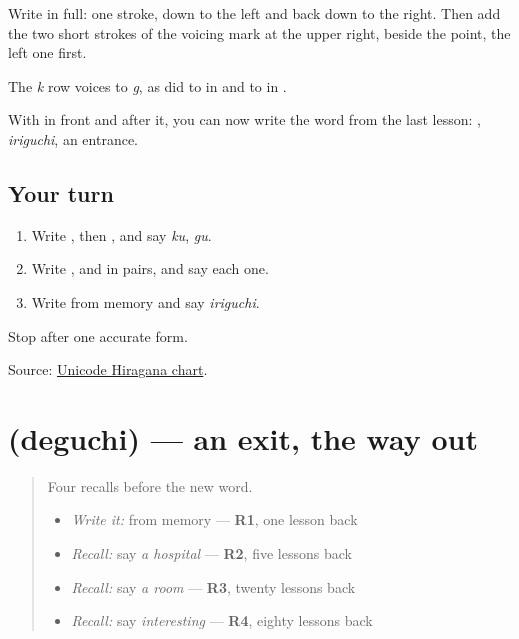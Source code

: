Write \textbf{} in full: one stroke, down to the left and back down to the right. Then add the two short strokes of the voicing mark at the upper right, beside the point, the left one first.

The \emph{k} row voices to \emph{g}, as \textbf{} did to \textbf{} in \textbf{} and \textbf{} to \textbf{} in \textbf{}.

With \textbf{} in front and \textbf{} after it, you can now write the word from the last lesson: \textbf{}, \emph{iriguchi}, an entrance.

\subsection*{Your turn}
\begin{enumerate}
\raggedright
  \item Write \textbf{}, then \textbf{}, and say \emph{ku}, \emph{gu}.
  \item Write \textbf{ }, \textbf{ } and \textbf{ } in pairs, and say each one.
  \item Write \textbf{} from memory and say \emph{iriguchi}.
\end{enumerate}

\begin{tcolorbox}[breakable,colback=teal!4,colframe=teal!35!black,title={Before you move on}]
Stop after one accurate form.

Source: \href{https://www.unicode.org/charts/PDF/U3040.pdf}{Unicode Hiragana chart}.
\end{tcolorbox}
\section[\texorpdfstring{\ja{でぐち} (deguchi)}{でぐち (deguchi)}]{ (deguchi) — an exit, the way out}

\label{lesson:JA-C135-deguchi}



\begin{quote}
Four recalls before the new word.

\begin{itemize}
\raggedright
  \item \emph{Write it:} \textbf{} from memory — \textbf{R1}, one lesson back
  \item \emph{Recall:} say \emph{a hospital} — \textbf{R2}, five lessons back
  \item \emph{Recall:} say \emph{a room} — \textbf{R3}, twenty lessons back
  \item \emph{Recall:} say \emph{interesting} — \textbf{R4}, eighty lessons back
\end{itemize}
\end{quote}

